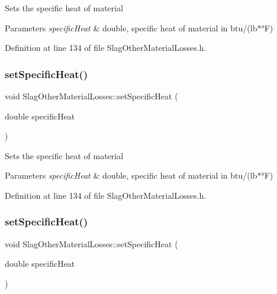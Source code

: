 Sets the specific heat of material 
\begin{DoxyParams}{Parameters}
{\em specific\+Heat} & double, specific heat of material in btu/(lb$\ast$°F) \\
\hline
\end{DoxyParams}


Definition at line 134 of file Slag\+Other\+Material\+Losses.\+h.

\mbox{\label{class_slag_other_material_losses_a05488997f264a74afe3229250a286f92}} 
\subsubsection{\texorpdfstring{set\+Specific\+Heat()}{setSpecificHeat()}\hspace{0.1cm}{\footnotesize\ttfamily [2/3]}}
{\footnotesize\ttfamily void Slag\+Other\+Material\+Losses\+::set\+Specific\+Heat (\begin{DoxyParamCaption}\item[{double}]{specific\+Heat }\end{DoxyParamCaption})\hspace{0.3cm}{\ttfamily [inline]}}

Sets the specific heat of material 
\begin{DoxyParams}{Parameters}
{\em specific\+Heat} & double, specific heat of material in btu/(lb$\ast$°F) \\
\hline
\end{DoxyParams}


Definition at line 134 of file Slag\+Other\+Material\+Losses.\+h.

\mbox{\label{class_slag_other_material_losses_a05488997f264a74afe3229250a286f92}} 
\subsubsection{\texorpdfstring{set\+Specific\+Heat()}{setSpecificHeat()}\hspace{0.1cm}{\footnotesize\ttfamily [3/3]}}
{\footnotesize\ttfamily void Slag\+Other\+Material\+Losses\+::set\+Specific\+Heat (\begin{DoxyParamCaption}\item[{double}]{specific\+Heat }\end{DoxyParamCaption})\hspace{0.3cm}{\ttfamily [inline]}}


